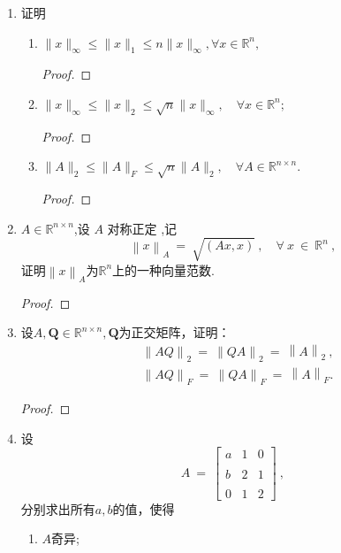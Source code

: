 \documentclass[a4paper]{article}
\begin{document}
\begin{enumerate}
\begin{enumerate}[label=（\arabic*）]
\begin{solution}
    \end{solution}
  \end{enumerate}

  \item 证明
  \begin{enumerate}[label=（\arabic*）]
    \item $\| x \|_\infty \leqslant \| x \|_1 \leqslant n \| x \|_\infty, \forall x \in \mathbb{R}^n,$
    \begin{proof}
      
    \end{proof}
    \item $\| x \|_{\infty} \leqslant \| x \|_{2} \leqslant \sqrt{n} \| x \|_{\infty}, \quad \forall x \in \mathbb{R}^{n};$
    \begin{proof}
      
    \end{proof}
    \item $\|A\|_2 \leqslant \|A\|_F \leqslant \sqrt{n} \|A\|_2, \quad \forall A \in \mathbb{R}^{n \times n}.$
    \begin{proof}
      
    \end{proof}
  \end{enumerate}

  \item $A\in \mathbb{R} ^{n\times n}$,设 $A$ 对称正定 ,记
  $$\left\|x\right\|_A\:=\:\sqrt{\left(Ax,x\right)}\:,\quad\forall\:x\:\in\:\mathbb{R}^n\:,$$
  证明$\left\|x\right\|_A$为$\mathbb{R}^n$上的一种向量范数.
  \begin{proof}
    
  \end{proof}
  
  \item 设$A,\boldsymbol{Q}\in\mathbb{R}^{n\times n},\boldsymbol{Q}$为正交矩阵，证明：
  $$\begin{aligned}&\left\|AQ\right\|_{2}\:=\:\left\|QA\right\|_{2}\:=\:\left\|A\right\|_{2}\:,\\&\left\|AQ\right\|_{F}\:=\:\left\|QA\right\|_{F}\:=\:\left\|A\right\|_{F}.\end{aligned}$$
  \begin{proof}
    
  \end{proof}

  \item 设
  $$A\:=\:\begin{bmatrix}a&1&0\\\\b&2&1\\\\0&1&2\end{bmatrix}\:,$$
  分别求出所有$a,b$的值，使得
  \begin{enumerate}[label=（\arabic*）]
    \item $A$奇异;
    \begin{solution}
      

\end{solution}
\end{enumerate}
\end{enumerate}
\end{document}
